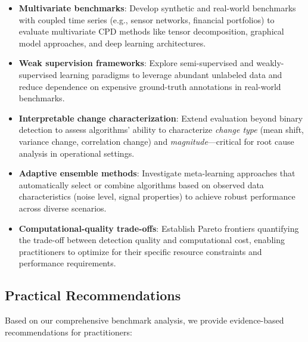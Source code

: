 \documentclass[journal,article,submit,pdftex,moreauthors]{Definitions/mdpi}
\begin{document}
\begin{itemize}
    \item \textbf{Multivariate benchmarks}: Develop synthetic and real-world benchmarks with coupled time series (e.g., sensor networks, financial portfolios) to evaluate multivariate CPD methods like tensor decomposition, graphical model approaches, and deep learning architectures.
    
    \item \textbf{Weak supervision frameworks}: Explore semi-supervised and weakly-supervised learning paradigms to leverage abundant unlabeled data and reduce dependence on expensive ground-truth annotations in real-world benchmarks.
    
    \item \textbf{Interpretable change characterization}: Extend evaluation beyond binary detection to assess algorithms' ability to characterize \textit{change type} (mean shift, variance change, correlation change) and \textit{magnitude}—critical for root cause analysis in operational settings.
    
    \item \textbf{Adaptive ensemble methods}: Investigate meta-learning approaches that automatically select or combine algorithms based on observed data characteristics (noise level, signal properties) to achieve robust performance across diverse scenarios.
    
    \item \textbf{Computational-quality trade-offs}: Establish Pareto frontiers quantifying the trade-off between detection quality and computational cost, enabling practitioners to optimize for their specific resource constraints and performance requirements.
\end{itemize}


\subsection{Practical Recommendations}

Based on our comprehensive benchmark analysis, we provide evidence-based recommendations for practitioners:
\end{document}

